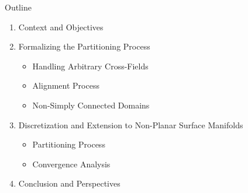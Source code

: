 \documentclass[compress,10pt,aspectratio=169]{beamer}
\begin{document}
\begin{frame}{Outline}
    \vspace{-0.4cm}
    \begin{enumerate}
        \item \color{onera} Context and Objectives \\\vspace{0.26cm}
        \item Formalizing the Partitioning Process %
        \vspace{0.26cm}
        \begin{itemize}
            \item Handling Arbitrary Cross-Fields\\\vspace{0.18cm}
            \item Alignment Process\\\vspace{0.18cm}
            \item Non-Simply Connected Domains\\\vspace{0.18cm}
        \end{itemize}
        \item Discretization and Extension to Non-Planar Surface Manifolds %
        \vspace{0.26cm}
        \begin{itemize}
            \item Partitioning Process\\\vspace{0.18cm}
            \item Convergence Analysis\\\vspace{0.18cm}
        \end{itemize}
        \item Conclusion and Perspectives
    \end{enumerate}
\end{frame}
\end{document}
